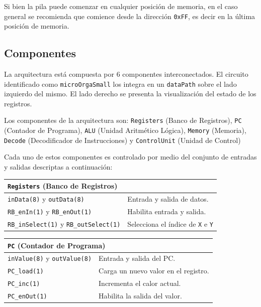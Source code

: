 \documentclass[a4paper,11pt]{article}
\begin{document}
Si bien la pila puede comenzar en cualquier posición de memoria, en el caso general se recomienda que comience desde la dirección \texttt{0xFF}, es decir en la última posición de memoria.

\subsection*{Componentes}

La arquitectura está compuesta por 6 componentes interconectados.
El circuito identificado como \texttt{microOrgaSmall} los integra en un \texttt{dataPath} sobre el lado izquierdo del mismo.
El lado derecho se presenta la visualización del estado de los registros.

Los componentes de la arquitectura son: 
\texttt{Registers} (Banco de Registros),
\texttt{PC} (Contador de Programa),
\texttt{ALU} (Unidad Aritmético Lógica),
\texttt{Memory} (Memoria),
\texttt{Decode} (Decodificador de Instrucciones) y
\texttt{ControlUnit} (Unidad de Control)

\bigskip

Cada uno de estos componentes es controlado por medio del conjunto de entradas y salidas descriptas a continuación:

\small

\begin{center}
\begin{tabular}{p{6.4cm}|p{8.2cm}}
\multicolumn{2}{l}{ \texttt{Registers} (Banco de Registros) }\\ %
\hline
\texttt{inData(8)} y \texttt{outData(8)}             & Entrada y salida de datos.\\
\texttt{RB\_enIn(1)} y \texttt{RB\_enOut(1)}         & Habilita entrada y salida.\\
\texttt{RB\_inSelect(1)} y \texttt{RB\_outSelect(1)} & Selecciona el índice de \texttt{X} e \texttt{Y}\\
\end{tabular}
\end{center}

\begin{center}
\begin{tabular}{p{6.4cm}|p{8.2cm}}
\multicolumn{2}{l}{ \texttt{PC} (Contador de Programa) }\\ %
\hline                                      
\texttt{inValue(8)} y \texttt{outValue(8)}  & Entrada y salida del PC.\\
\texttt{PC\_load(1)}                        & Carga un nuevo valor en el registro.\\
\texttt{PC\_inc(1)}                         & Incrementa el calor actual.\\
\texttt{PC\_enOut(1)}                       & Habilita la salida del valor.\\
\end{tabular}
\end{center}
\end{document}

